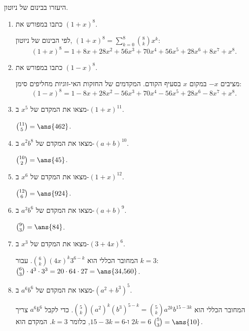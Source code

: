 היעזרו בבינום של ניוטון.
\begin{enumerate}
\item כתבו במפורש את $(1+x)^8$.
\begin{solbox}
לפי הבינום של ניוטון, $(1+x)^8=\sum_{k=0}^8\binom8kx^k$:
\[
(1+x)^8=1+8x+28x^2+56x^3+70x^4+56x^5+28x^6+8x^7+x^8.
\]
\end{solbox}
\item כתבו במפורש את $(1-x)^8$.
\begin{solbox}
מציבים $-x$ במקום $x$ בסעיף הקודם. המקדמים של החזקות האי-זוגיות מחליפים סימן:
\[
(1-x)^8=1-8x+28x^2-56x^3+70x^4-56x^5+28x^6-8x^7+x^8.
\]
\end{solbox}
\item מצאו את המקדם של $x^5$ ב-$(1+x)^{11}$.
\begin{solbox}
$\binom{11}5=\ans{462}$.
\end{solbox}
\item מצאו את המקדם של $a^2b^8$ ב-$(a+b)^{10}$.
\begin{solbox}
$\binom{10}2=\ans{45}$.
\end{solbox}
\item מצאו את המקדם של $x^6$ ב-$(1+x)^{12}$.
\begin{solbox}
$\binom{12}6=\ans{924}$.
\end{solbox}
\item מצאו את המקדם של $a^3b^6$ ב-$(a+b)^9$.
\begin{solbox}
$\binom93=\ans{84}$.
\end{solbox}
\item מצאו את המקדם של $x^3$ ב-$(3+4x)^6$.
\begin{solbox}
המחובר הכללי הוא $\binom6k(4x)^k3^{6-k}$. עבור $k=3$: $\binom63\cdot4^3\cdot3^3=20\cdot64\cdot27=\ans{34{,}560}$.
\end{solbox}
\item מצאו את המקדם של $a^6b^6$ ב-$(a^2+b^3)^5$.
\begin{solbox}
המחובר הכללי הוא $\binom5k(a^2)^k(b^3)^{5-k}=\binom5ka^{2k}b^{15-3k}$. כדי לקבל $a^6b^6$ צריך $2k=6$ ו-$15-3k=6$, כלומר $k=3$. המקדם הוא $\binom53=\ans{10}$.
\end{solbox}
\end{enumerate}
